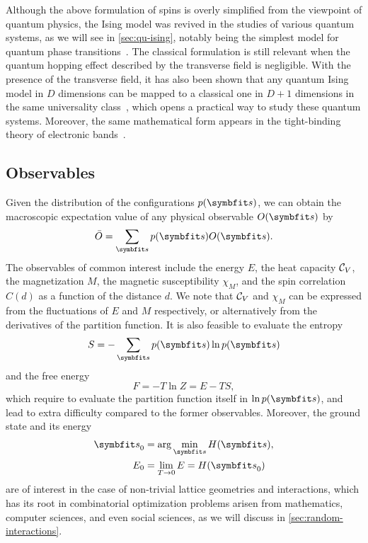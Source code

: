 Although the above formulation of spins is overly simplified from the viewpoint of quantum physics, the Ising model was revived in the studies of various quantum systems, as we will see in \cref{sec:qu-ising}, notably being the simplest model for quantum phase transitions~\cite{sachdev2001quantum}. The classical formulation is still relevant when the quantum hopping effect described by the transverse field is negligible. With the presence of the transverse field, it has also been shown that any quantum Ising model in $D$ dimensions can be mapped to a classical one in $D + 1$ dimensions in the same universality class~\cite{hertz1976quantum}, which opens a practical way to study these quantum systems. Moreover, the same mathematical form appears in the tight-binding theory of electronic bands~\cite{treglia1988segregation}.

\subsection{Observables}

Given the distribution of the configurations $p(\vs)$, we can obtain the macroscopic expectation value of any physical observable $O(\vs)$ by
\begin{equation}
\bar{O} = \sum_\vs p(\vs) O(\vs).
\label{eq:cl-obs}
\end{equation}
The observables of common interest include the energy $E$, the heat capacity $\mathcal{C}_V$, the magnetization $M$, the magnetic susceptibility $\chi_M$, and the spin correlation $C(d)$ as a function of the distance $d$. We note that $\mathcal{C}_V$ and $\chi_M$ can be expressed from the fluctuations of $E$ and $M$ respectively, or alternatively from the derivatives of the partition function. It is also feasible to evaluate the entropy
\begin{equation}
S = -\sum_\vs p(\vs) \ln p(\vs)
\end{equation}
and the free energy
\begin{equation}
F = -T \ln Z = E - T S,
\end{equation}
which require to evaluate the partition function itself in $\ln p(\vs)$, and lead to extra difficulty compared to the former observables. Moreover, the ground state and its energy
\begin{align}
\vs_0 &= \arg\min_\vs H(\vs), \\
E_0 &= \lim_{T \to 0} E = H(\vs_0)
\end{align}
are of interest in the case of non-trivial lattice geometries and interactions, which has its root in combinatorial optimization problems arisen from mathematics, computer sciences, and even social sciences, as we will discuss in \cref{sec:random-interactions}.

